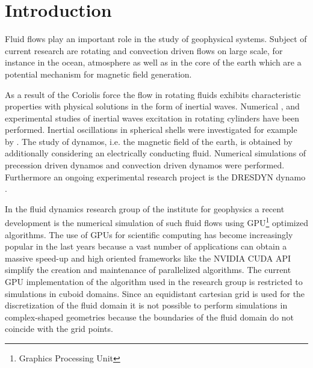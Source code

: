 \chapter*{Introduction}

Fluid flows play an important role in the study of geophysical systems.
Subject of current research are rotating and convection driven flows on large scale, for instance in the ocean, atmosphere as
well as in the core of the earth which are a potential mechanism for magnetic field generation.

As a result of the Coriolis force the flow in rotating fluids exhibits characteristic properties with
physical solutions in the form of inertial waves.
Numerical \citep{Sauret2012}, \citep{Duguet} and experimental
studies \citep{Fultz1959} of inertial waves excitation in rotating cylinders have been performed.
Inertial oscillations in spherical shells were investigated for example by \citep{Tilgner1999}.
The study of dynamos, i.e. the magnetic field of the earth, is obtained by additionally
considering an electrically conducting fluid.
Numerical simulations of precession driven dynamos \citep{Tilgner2005}
and convection driven dynamos \citep{Tilgner2012} were performed. Furthermore
an ongoing experimental research project is the DRESDYN dynamo \citep{Stefani2015}.

In the fluid dynamics research group of the institute for geophysics
a recent development is the numerical simulation of such fluid flows using GPU\footnote{Graphics Processing Unit} optimized algorithms.
The use of GPUs for scientific computing has become increasingly popular in the last years because
a vast number of applications  can obtain a massive speed-up and
high oriented frameworks like the NVIDIA CUDA API simplify the creation
and maintenance of parallelized algorithms.
The current GPU implementation of the algorithm used in the research group is restricted
to simulations in cuboid domains.
Since an equidistant cartesian grid is used for the discretization of the fluid
domain it is not possible to perform simulations in complex-shaped geometries
because the boundaries of the fluid domain  do not coincide with the grid points.

